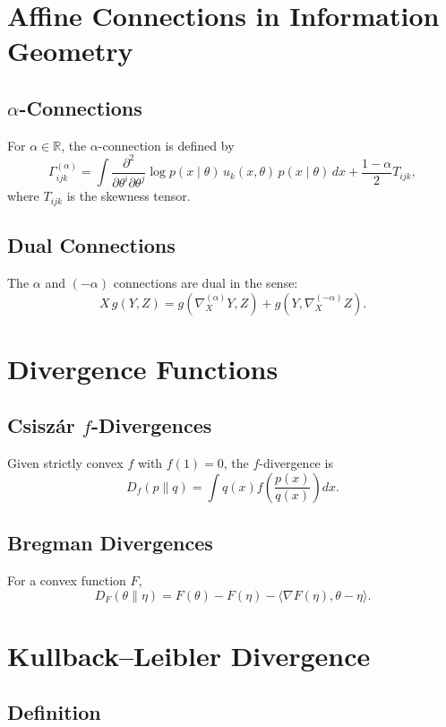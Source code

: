 \section{Affine Connections in Information Geometry}

\subsection{$\alpha$-Connections}

For $\alpha \in \mathbb{R}$, the $\alpha$-connection is defined by
\[
\Gamma_{ijk}^{(\alpha)}
  = \int \frac{\partial^2}{\partial\theta^i\partial\theta^j}\log p(x\mid\theta)\,
    u_k(x,\theta)\,p(x\mid\theta)\,dx
  + \frac{1-\alpha}{2} T_{ijk},
\]
where $T_{ijk}$ is the skewness tensor.

\subsection{Dual Connections}

The $\alpha$ and $(-\alpha)$ connections are dual in the sense:
\[
X\,g(Y,Z) = g(\nabla_X^{(\alpha)} Y, Z) + g(Y, \nabla_X^{(-\alpha)} Z).
\]

\section{Divergence Functions}

\subsection{Csiszár $f$-Divergences}

Given strictly convex $f$ with $f(1)=0$, the $f$-divergence is
\[
D_f(p\|q)
  = \int q(x) f\!\left(\frac{p(x)}{q(x)}\right) dx.
\]

\subsection{Bregman Divergences}

For a convex function $F$,
\[
D_F(\theta\|\eta)
  = F(\theta) - F(\eta)
    - \langle \nabla F(\eta), \theta - \eta \rangle.
\]

\section{Kullback–Leibler Divergence}

\subsection{Definition}

